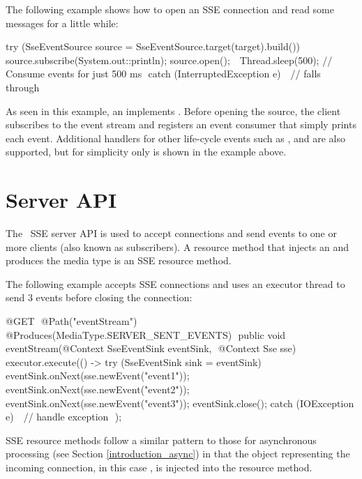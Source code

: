 The following example shows how to open an SSE connection and read some messages for a little
while:

\begin{listing}{1}
  try (SseEventSource source = SseEventSource.target(target).build()) {
	source.subscribe(System.out::println);
	source.open();  
	Thread.sleep(500); 		// Consume events for just 500 ms 
  } catch (InterruptedException e) { 
	// falls through 
  }
\end{listing}

As seen in this example, an  implements . Before opening the source, the client subscribes to the event stream and registers an event consumer that simply prints each event. Additional handlers for other life-cycle events such as ,  and  are also supported, but for simplicity only  is shown in the example above.

\section{Server API}
\label{sse_server_api}

The \jaxrs\ SSE server API is used to accept connections and send events to one or more clients (also known as subscribers). A resource method that injects an  and produces the media type  is an SSE resource method.

The following example accepts SSE connections and uses an executor thread to send 3 events before closing the connection:

\begin{listing}{1}
@GET 
@Path("eventStream") 
@Produces(MediaType.SERVER_SENT_EVENTS) 
public void eventStream(@Context SseEventSink eventSink, 
                        @Context Sse sse) {
  executor.execute(() -> {
    try (SseEventSink sink = eventSink) {  
      eventSink.onNext(sse.newEvent("event1"));
      eventSink.onNext(sse.newEvent("event2"));
      eventSink.onNext(sse.newEvent("event3"));
      eventSink.close();
	} catch (IOException e) { 
	  // handle exception 
	}
  });
}
\end{listing}

SSE resource methods follow a similar pattern to those for asynchronous processing (see Section \ref{introduction_async}) in that the object representing the incoming connection, in this case , is injected into the resource method. 

